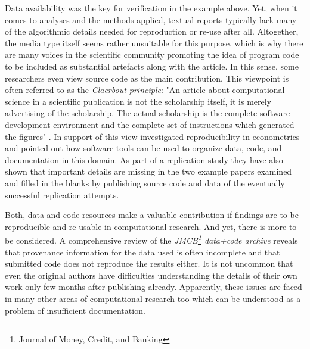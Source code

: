 \documentclass{acm_proc_article-sp}
\begin{document}
Data availability was the key for verification in the example above.
Yet, when it comes to analyses and the methods applied, textual reports typically lack many of the algorithmic details needed for reproduction or re-use after all.
Altogether, the media type itself seems rather unsuitable for this purpose, which is why there are many voices in the scientific community promoting the idea of program code to be included as substantial artefacts along with the article.
In this sense, some researchers even view source code as the main contribution.
This viewpoint is often referred to as the \textit{Claerbout principle}:
"An article about computational science in a scientific publication is not the scholarship itself, it is merely advertising of  the scholarship. The actual scholarship is the complete software development environment and the complete set of instructions which generated the figures" \cite{Buckheit1995b} \cite{de2001reproducible}.
In support of this view \cite{KoenkerZeileis2009} investigated reproducibility in econometrics and pointed out how software tools can be used to organize data, code, and documentation in this domain.
As part of a replication study they have also shown that important details are missing in the two example papers examined and filled in the blanks by publishing source code and data of the eventually successful replication attempts.

Both, data and code resources make a valuable contribution if findings are to be reproducible and re-usable in computational research.
And yet, there is more to be considered.
A comprehensive review of the \textit{JMCB\footnote{Journal of Money, Credit, and Banking} data+code archive} reveals that provenance information for the data used is often incomplete and that submitted code does not reproduce the results either.
It is not uncommon that even the original authors have difficulties understanding the details of their own work only few months after publishing already.
Apparently, these issues are faced in many other areas of computational research too
\cite{hothorn2011case}
\cite{gonzalez2012reproducibility}
\cite{vandewalle2009reproducible}
\cite{cassey2006reproducibility}
which can be understood as a problem of insufficient documentation.
\end{document}
